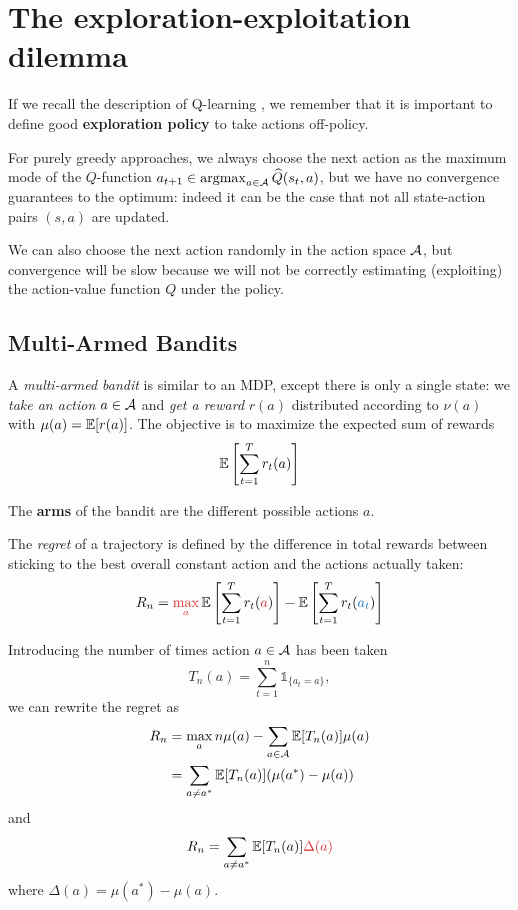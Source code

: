 \documentclass[../course-notes.tex]{subfiles}
\begin{document}
\chapter{The exploration-exploitation dilemma}

If we recall the description of Q-learning , we remember that it is important to define good \textbf{exploration policy} to take actions off-policy.

For purely greedy approaches, we always choose the next action as the maximum mode of the $Q$-function $a_{t+1} \in \operatorname*{\mathrm{argmax}}_{a\in\mathcal{A}} \widehat{Q}(s_t, a)$, but we have no convergence guarantees to the optimum: indeed it can be the case that not all state-action pairs $(s,a)$ are updated.

We can also choose the next action randomly in the action space $\mathcal{A}$, but convergence will be slow because we will not be correctly estimating (exploiting) the action-value function $Q$ under the policy.


\section{Multi-Armed Bandits}

A \textit{multi-armed bandit} is similar to an MDP, except there is only a single state: we \textit{take an action} $a\in\mathcal{A}$ and \textit{get a reward} $r(a)$ distributed according to $\nu(a)$ with $\mu(a) = \operatorname{\mathbb{E}}[r(a)]$. The objective is to maximize the expected sum of rewards
\[
	\operatorname{\mathbb{E}}\left[ \sum_{t=1}^T r_t(a) \right]
\]

The \textbf{arms} of the bandit are the different possible actions $a$.

\begin{defn}[Regret]
The \emph{regret} of a trajectory is defined by the difference in total rewards between sticking to the best overall constant action and the actions actually taken:
\[
	R_n = {\redfont \max_a} \EE\left[\sum_{t=1}^T r_t({\redfont a})\right]
	- \EE\left[
	\sum_{t=1}^T r_t({\bluefont a_t})
	\right]
\]
\end{defn}

Introducing the number of times action $a\in\mathcal{A}$ has been taken
\[
	T_n(a) = \sum_{t=1}^{n} \mathds{1}_{\{a_t = a\}},
\]
we can rewrite the regret as
\begin{equation}
\begin{aligned}
	R_n &= \max_a n\mu(a) - \sum_{a\in\mathcal{A}} \operatorname{\mathbb{E}}[T_n(a)] \mu(a) \\
	&= \sum_{a\neq a^*} \operatorname{\mathbb{E}}[T_n(a)] (\mu(a^*) - \mu(a))
\end{aligned}
\end{equation}
and
\begin{equation}
	R_n = \sum_{a\neq a^*} \EE[T_n(a)] {\redfont \Delta(a)} 
\end{equation}
where $\Delta(a) = \mu(a^*) - \mu(a)$.
\end{document}
